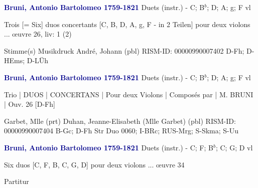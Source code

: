 \documentclass[twocolumn]{book}
\begin{document}
\newline \par \vspace{7pt} \textcolor{darkblue}{\textbf{Bruni, Antonio Bartolomeo  1759-1821}}
\newline Duets (instr.) - C; B$^b$; D; A; g; F
 vl
\newline \begin{itshape}Trois [= Six] duos concertants [C, B, D, A, g, F - in 2 Teilen] pour deux violons ... œuvre 26, liv: 1 (2)\end{itshape} 
\newline \textcolor{darkblue}{}  Stimme(s)
\newline Musikdruck
\newline André, Johann  (pbl)
\newline RISM-ID: 00000990007402
\newline D-Fh; D-HEms; D-LÜh
\newline \par \vspace{7pt} \textcolor{darkblue}{\textbf{Bruni, Antonio Bartolomeo  1759-1821}}
\newline Duets (instr.) - C; B$^b$; D; A; g; F
 vl
\newline \begin{itshape}Trio | DUOS | CONCERTANS | Pour deux Violons | Composés par | M. BRUNI | Ouv. 26 [D-Fh]\end{itshape} 
\newline Garbet, Mlle  (prt)
\newline Duhan, Jeanne-Elisabeth (Mlle Garbet)  (pbl)
\newline RISM-ID: 00000990007404
\newline B-Gc; D-Fh  Str Duo 0060; I-BRc; RUS-Mrg; S-Skma; S-Uu
\newline \par \vspace{7pt} \textcolor{darkblue}{\textbf{Bruni, Antonio Bartolomeo  1759-1821}}
\newline Duets (instr.) - C; F; B$^b$; C; G; D
 vl
\newline \begin{itshape}Six duos [C, F, B, C, G, D] pour deux violons ... œuvre 34\end{itshape} 
\newline \textcolor{darkblue}{}  Partitur
\end{document}
